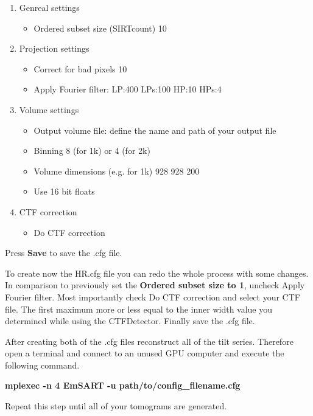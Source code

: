 \documentclass[12pt,a4paper]{scrartcl}
\begin{document}
{\begin{enumerate}
\item Genreal settings
\begin{itemize}
\item Ordered subset size (SIRTcount) 10 
\end{itemize}
\item Projection settings
\begin{itemize}
\item Correct for bad pixels 10
\item \CheckedBox Apply Fourier filter: LP:400 LPs:100 HP:10 HPs:4   
\end{itemize}
\item Volume settings
\begin{itemize}
\item Output volume file: define the name and path of your output file
\item Binning 8 (for 1k) or 4 (for 2k) 
\item Volume dimensions (e.g. for 1k) 928 928 200
\item\Square\hspace{0.1em}  Use 16 bit floats
\end{itemize}
\item CTF correction
\begin{itemize}
\item\Square\hspace{0.1em}  Do CTF correction 
\end{itemize}
\end{enumerate}

Press \textbf{Save} to save the .cfg file. 
\vspace{1em}
\par To create now the HR.cfg file you can redo the whole process with some changes. In comparison to previously set the \textbf{Ordered subset size to 1}, uncheck Apply Fourier filter. Most importantly check Do CTF correction and select your CTF file. The first maximum more or less equal to the inner width value you determined while using the CTFDetector. Finally save the .cfg file.

After creating both of the .cfg files reconstruct all of the tilt series. Therefore open a terminal and connect to an unused GPU computer and execute the following command. 
\vspace{1em}
\par\textbf{mpiexec -n 4 EmSART -u path/to/config\_filename.cfg}
\vspace{1em}
\par Repeat this step until all of your tomograms are generated. 
             

}
\end{document}
